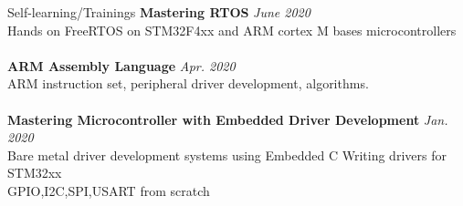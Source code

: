 \documentclass{resume} %
\begin{document}
\begin{rSection}{Self-learning/Trainings}
{\bf Mastering RTOS} \hfill {\em June 2020} \\
Hands on FreeRTOS on STM32F4xx and ARM cortex M bases microcontrollers\\
\\
{\bf ARM Assembly Language} \hfill {\em Apr. 2020} \\
ARM instruction set, peripheral driver development, algorithms.\\
\\
{\bf Mastering Microcontroller with Embedded Driver Development} \hfill {\em Jan. 2020} \\
Bare metal driver development systems using Embedded C Writing drivers for STM32xx \\
GPIO,I2C,SPI,USART from scratch\\
\end{rSection}
\end{document}
